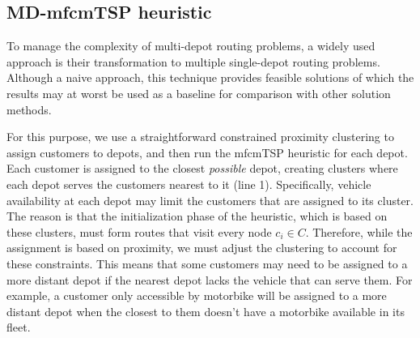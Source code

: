 \documentclass{article}
\begin{document}
	\subsection{MD-mfcmTSP heuristic}
	To manage the complexity of multi-depot routing problems, a widely used approach is their transformation to multiple single-depot routing problems. Although a naive approach, this technique provides feasible solutions of which the results may at worst be used as a baseline for comparison with other solution methods.
	\par 
	For this purpose, we use a straightforward constrained proximity clustering to assign customers to depots, and then run the mfcmTSP heuristic for each depot. Each customer is assigned to the closest \textit{possible} depot, creating clusters where each depot serves the customers nearest to it (line 1). Specifically, vehicle availability at each depot may limit the customers that are assigned to its cluster. The reason is that the initialization phase of the heuristic, which is based on these clusters, must form routes that visit every node $c_i\in C$. Therefore, while the assignment is based on proximity, we must adjust the clustering to account for these constraints. This means that some customers may need to be assigned to a more distant depot if the nearest depot lacks the vehicle that can serve them. For example, a customer only accessible by motorbike will be assigned to a more distant depot when the closest to them doesn't have a motorbike available in its fleet.
	\par 
\end{document}
